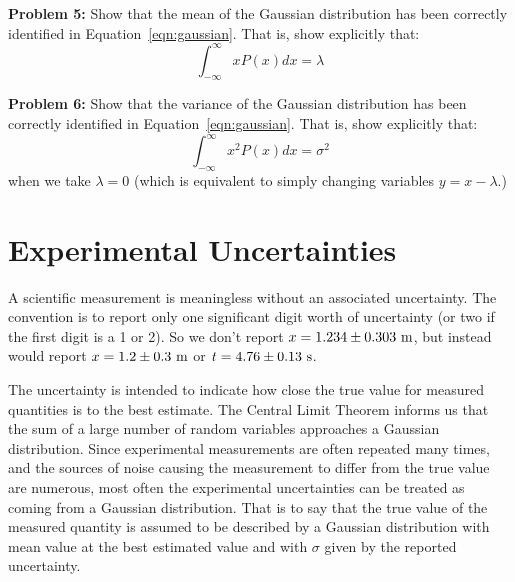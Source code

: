 \documentclass[12pt]{article}
\begin{document}
\vskip 1cm
\noindent
{\bf Problem 5:} Show that the mean of the Gaussian distribution has been correctly identified in Equation~\ref{eqn:gaussian}.  That is, show explicitly that:
\begin{displaymath}
\int_{-\infty}^{\infty} x P(x) dx = \lambda 
\end{displaymath}

\vskip 1cm
\noindent
{\bf Problem 6:} Show that the variance of the Gaussian distribution has been correctly identified in Equation~\ref{eqn:gaussian}.  That is, show explicitly that:
\begin{displaymath}
\int_{-\infty}^{\infty} x^2 P(x) dx = \sigma^2 
\end{displaymath}
when we take $\lambda=0$ (which is equivalent to simply changing variables $y=x-\lambda$.)
   
%

\newpage

\section{Experimental Uncertainties}

A scientific measurement is meaningless without an associated uncertainty.  The convention is to report only one significant digit worth of uncertainty (or two if the first digit is a 1 or 2).  So we don't report $x = 1.234 \pm 0.303~\rm{m}$, but instead would report $x= 1.2 \pm 0.3~\rm{m}$ or $t = 4.76 \pm 0.13~\rm{s}$. 

The uncertainty is intended to indicate how close the true value for measured quantities is to the best estimate.  The Central Limit Theorem informs us that the sum of a large number of random variables approaches a Gaussian distribution.  Since experimental measurements are often repeated many times, and the sources of noise causing the measurement to differ from the true value are numerous, most often the experimental uncertainties can be treated as coming from a Gaussian distribution.  That is to say that the true value of the measured quantity is assumed to be described by a Gaussian distribution with mean value at the best estimated value and with $\sigma$ given by the reported uncertainty.
\end{document}
